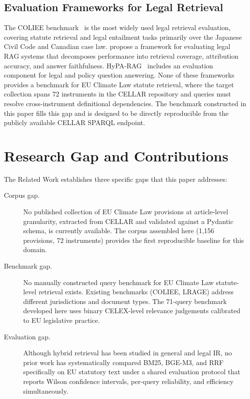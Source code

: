 \documentclass{iosart2x}
\newcommand{\bgem}{BGE-M3\xspace}
\newcommand{\rrf}{RRF\xspace}
\begin{document}
\subsection{Evaluation Frameworks for Legal Retrieval}
\label{sec:related-eval}

The COLIEE benchmark~\cite{nowjcoliee2023} is the most widely used
legal retrieval evaluation, covering statute retrieval and legal
entailment tasks primarily over the Japanese Civil Code and Canadian
case law.  \citet{lrage2024} propose a framework for evaluating legal
RAG systems that decomposes performance into retrieval coverage,
attribution accuracy, and answer faithfulness.  HyPA-RAG~\cite{hyparag2024}
includes an evaluation component for legal and policy question answering.
None of these frameworks provides a benchmark for EU Climate Law
statute retrieval, where the target collection spans 72 instruments in
the CELLAR repository and queries must resolve cross-instrument
definitional dependencies.  The benchmark constructed in this paper
fills this gap and is designed to be directly reproducible from the
publicly available CELLAR SPARQL endpoint.

\section{Research Gap and Contributions}
\label{sec:gap}

The Related Work establishes three specific gaps that this paper
addresses:

\begin{description}
  \item[Corpus gap.]  No published collection of EU Climate Law
    provisions at article-level granularity, extracted from CELLAR and
    validated against a Pydantic schema, is currently available.  The
    corpus assembled here (1,156 provisions, 72 instruments) provides
    the first reproducible baseline for this domain.

  \item[Benchmark gap.]  No manually constructed query benchmark for
    EU Climate Law statute-level retrieval exists.  Existing benchmarks
    (COLIEE, LRAGE) address different jurisdictions and document types.
    The 71-query benchmark developed here uses binary CELEX-level
    relevance judgements calibrated to EU legislative practice.

  \item[Evaluation gap.]  Although hybrid retrieval has been studied in
    general and legal IR, no prior work has systematically compared
    BM25, \bgem, and \rrf specifically on EU statutory text under a
    shared evaluation protocol that reports Wilson confidence
    intervals, per-query reliability, and efficiency simultaneously.
\end{description}
\end{document}
